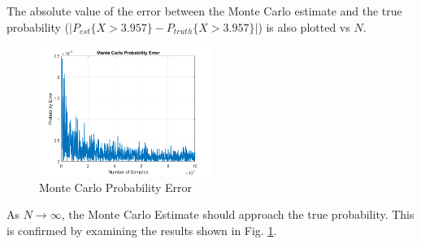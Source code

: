 \documentclass[conference]{IEEEtran}
\begin{document}
\noindent
The absolute value of the error between the Monte Carlo estimate and the true probability ($|P_{est}\{X > 3.957\} - P_{truth}\{X > 3.957\}|$) is also plotted vs $N$.
\begin{figure}[H]
\centerline{\includegraphics[width=0.5\textwidth]{Monte_Carlo_Error.png}}
\caption{Monte Carlo Probability Error}
\label{Monte Carlo Perr}
\end{figure}
As $N\rightarrow\infty$, the Monte Carlo Estimate should approach the true probability. This is confirmed by examining the results shown in Fig. \ref{Monte Carlo Perr}.
\end{document}
